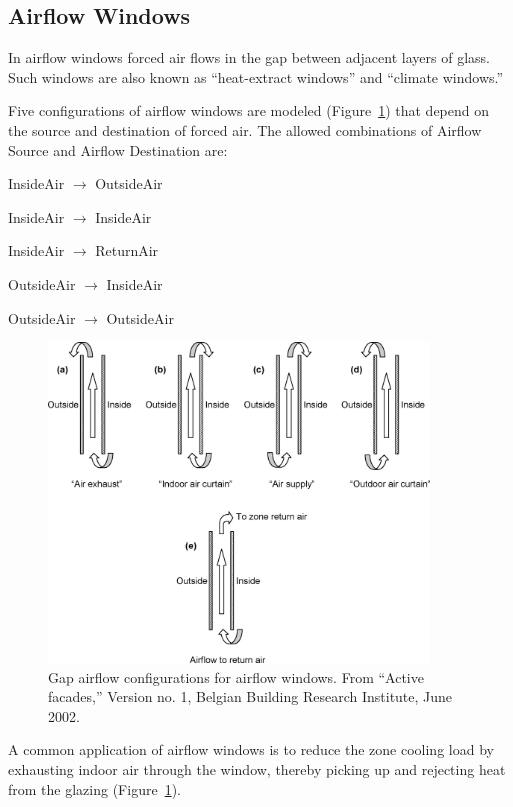 \subsection{Airflow Windows}\label{airflow-windows}

In airflow windows forced air flows in the gap between adjacent layers of glass. Such windows are also known as ``heat-extract windows'' and ``climate windows.''

Five configurations of airflow windows are modeled (Figure~\ref{fig:gap-airflow-configurations-for-airflow}) that depend on the source and destination of forced air. The allowed combinations of Airflow Source and Airflow Destination are:

InsideAir $\rightarrow$ OutsideAir

InsideAir $\rightarrow$ InsideAir

InsideAir $\rightarrow$ ReturnAir

OutsideAir $\rightarrow$ InsideAir

OutsideAir $\rightarrow$ OutsideAir

\begin{figure}[hbtp] %
\centering
\includegraphics[width=0.9\textwidth, height=0.9\textheight, keepaspectratio=true]{media/image1748.png}
\caption{Gap airflow configurations for airflow windows. From “Active facades,” Version no. 1, Belgian Building Research Institute, June 2002. \protect \label{fig:gap-airflow-configurations-for-airflow}}
\end{figure}

A common application of airflow windows is to reduce the zone cooling load by exhausting indoor air through the window, thereby picking up and rejecting heat from the glazing (Figure~\ref{fig:gap-airflow-configurations-for-airflow}).


